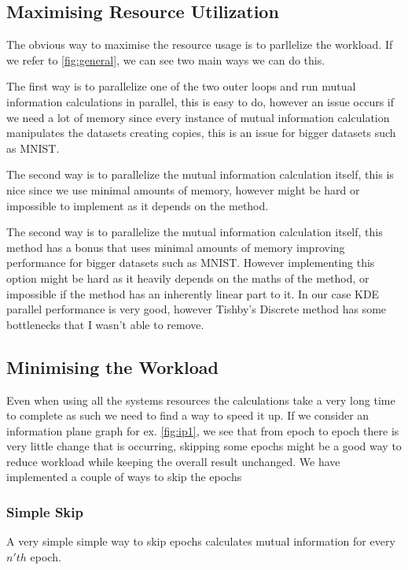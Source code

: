 \subsection{Maximising Resource Utilization}

The obvious way to maximise the resource usage is to parllelize the workload.
If we refer to \autoref{fig:general}, we can see two main ways we can do this.

The first way is to parallelize one of the two outer loops and run mutual
information calculations in parallel, this is easy to do, however an issue
occurs if we need a lot of memory since every instance of mutual information
calculation manipulates the datasets creating copies, this is an issue for
bigger datasets such as MNIST.

The second way is to parallelize the mutual information calculation itself, this
is nice since we use minimal amounts of memory, however might be hard or
impossible to implement as it depends on the method.

The second way is to parallelize the mutual information calculation itself, this
method has a  bonus that uses minimal amounts of memory improving performance
for bigger datasets such as MNIST. However implementing this option might be
hard as it heavily depends on the maths of the method, or impossible if the
method has an inherently linear part to it. In our case KDE parallel performance
is very good, however Tishby's Discrete method has some bottlenecks that I
wasn't able to remove.

\subsection{Minimising the Workload}

Even when using all the systems resources the calculations take a very long
time to complete as such we need to find a way to speed it up. If we consider an
information plane graph for ex. \autoref{fig:ip1}, we see that from epoch to
epoch there is very little change that is occurring, skipping some epochs might
be a good way to reduce workload while keeping the overall result unchanged. We
have implemented a couple of ways to skip the epochs 

\subsubsection{Simple Skip}
  
  A very simple simple way to skip epochs calculates mutual information for
  every $n'th$ epoch.

